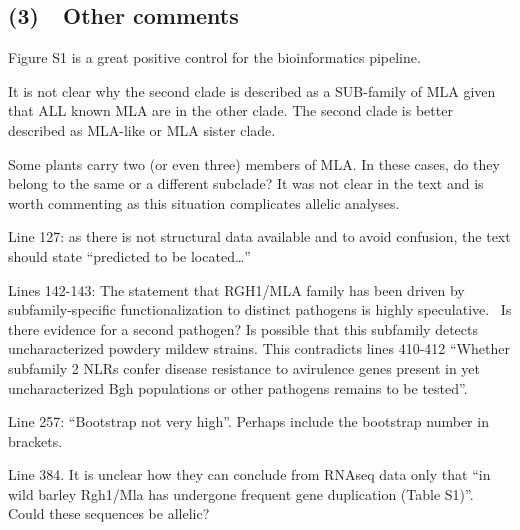 \documentclass[10pt]{article}
\begin{document}
\subsection*{}

{\label{485825}}

\subsection*{(3)~~Other comments}

{\label{485825}}

Figure S1 is a great positive control for the bioinformatics pipeline.

\par\null

It is not clear why the second clade is described as a SUB-family of MLA
given that ALL known MLA are in the other clade. The second clade is
better described as MLA-like or MLA sister clade.

\par\null

Some plants carry two (or even three) members of MLA. In these cases, do
they belong to the same or a different subclade? It was not clear in the
text and is worth commenting as this situation complicates allelic
analyses.

\par\null

Line 127: as there is not structural data available and to avoid
confusion, the text should state ``predicted to be located\ldots{}''

\par\null

Lines 142-143: The statement that RGH1/MLA family has been driven by
subfamily-specific functionalization to distinct pathogens is highly
speculative.~ Is there evidence for a second pathogen? Is possible that
this subfamily detects uncharacterized powdery mildew strains. This
contradicts lines 410-412 ``Whether subfamily 2 NLRs confer disease
resistance to avirulence genes present in yet uncharacterized Bgh
populations or other pathogens remains to be tested''.

\par\null

Line 257: ``Bootstrap not very high''. Perhaps include the bootstrap
number in brackets.

\par\null

Line 384. It is unclear how they can conclude from RNAseq data only that
``in wild barley Rgh1/Mla has undergone frequent gene duplication (Table
S1)''. Could these sequences be allelic?
\end{document}
